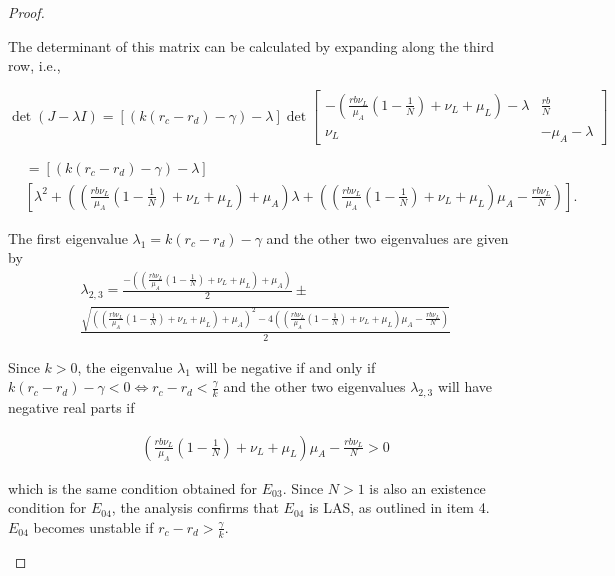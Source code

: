 \documentclass{article}
\theoremstyle{remark}
\theoremstyle{custom} %
\begin{document}
\begin{proof}
\begin{itemize}
The determinant of this matrix can be calculated by expanding along the third row, i.e.,

$$
\operatorname{det}(J-\lambda I)=[(k(r_c - r_d)-\gamma)-\lambda]  \operatorname{det}\left[\begin{array}{cc}
-\left(\frac{r b \nu_L}{\mu_A}\left(1-\frac{1}{{N}}\right)+\nu_L+\mu_L\right)-\lambda & \frac{r b}{{N}} \\
\nu_L & -\mu_A-\lambda
\end{array}\right]
$$


$$
\begin{aligned}
& =[(k(r_c - r_d) -\gamma)-\lambda] \\
& {\left[\lambda^2+\left(\left(\frac{r b \nu_L}{\mu_A}\left(1-\frac{1}{{N}}\right)+\nu_L+\mu_L\right)+\mu_A\right) \lambda+\left(\left(\frac{r b \nu_L}{\mu_A}\left(1-\frac{1}{{N}}\right)+\nu_L+\mu_L\right) \mu_A-\frac{r b \nu_L}{{N}}\right)\right]}.
\end{aligned}
$$

The first eigenvalue \(\lambda_1=k\left(r_c-r_d\right)-\gamma\) and the other two eigenvalues are given by $$
\begin{aligned}
& \lambda_{2,3}=\frac{-\left(\left(\frac{r b \nu_L}{\mu_A}\left(1-\frac{1}{{N}}\right)+\nu_L+\mu_L\right)+\mu_A\right)}{2} \pm \\
& \frac{\sqrt{\left(\left(\frac{r b \nu_L}{\mu_A}\left(1-\frac{1}{{N}}\right)+\nu_L+\mu_L\right)+\mu_A\right)^2-4\left(\left(\frac{r b \nu_L}{\mu_A}\left(1-\frac{1}{{N}}\right)+\nu_L+\mu_L\right) \mu_A-\frac{r b \nu_L}{{N}}\right)}}{2}
\end{aligned}
$$


Since $k>0$, the eigenvalue \(\lambda_1\) will be negative if and only if $k\left(r_c-r_d\right)-\gamma<0 \Leftrightarrow r_c-r_d<\frac{\gamma}{k}$ and the other two eigenvalues \(\lambda_{2,3}\) will have negative real parts if 

$$
\begin{aligned}
& \left(\frac{r b \nu_L}{\mu_A}\left(1-\frac{1}{{N}}\right)+\nu_L+\mu_L\right) \mu_A-\frac{r b \nu_L}{{N}}>0 
\end{aligned}
$$

which is the same condition obtained for $E_{03}$. Since $N>1$ is also an existence condition for $E_{04}$, the analysis confirms that $E_{04}$ is LAS, as outlined in item 4. $E_{04}$ becomes unstable if $r_c-r_d>\frac{\gamma}{k}$.


\end{itemize}
\end{proof}
\end{document}
